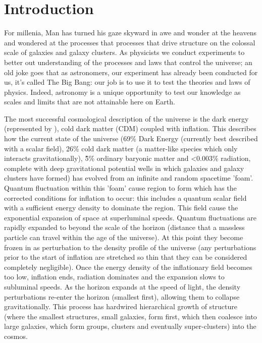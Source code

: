 \chapter{Introduction}
For millenia, Man has turned his gaze skyward in awe and wonder at the heavens and wondered at the processes that processes that drive structure on the colossal scale of galaxies and galaxy clusters. As physicists we conduct experiments to better out understanding of the processes and laws that control the universe; an old joke goes that as astronomers, our experiment has already been conducted for us, it's called The Big Bang: our job is to use it to test the theories and laws of physics. Indeed, astronomy is a unique opportunity to test our knowledge as scales and limits that are not attainable here on Earth.


The most successful cosmological description of the universe is the dark energy (represented by \textLambda), cold dark matter ({\textLambda}CDM) coupled with inflation. This describes how the current state of the universe (69\% Dark Energy (currently best described with a scalar field), 26\% cold dark matter (a matter-like species which only interacts gravitationally), \~5\% ordinary baryonic matter and <0.003\% radiation, complete with deep gravitational potential wells in which galaxies and galaxy clusters have formed) has evolved from an infinite and random spacetime 'foam'. Quantum fluctuation within this 'foam' cause region to form which has the corrected conditions for inflation to occur: this includes a quantum scalar field with a sufficient energy density to dominate the region. This field cause the exponential expansion of space at superluminal speeds. Quantum fluctuations are rapidly expanded to beyond the scale of the horizon (distance that a massless particle can travel within the age of the universe). At this point they become frozen in as perturbation to the density profile of the universe (any perturbations prior to the start of inflation are stretched so thin that they can be considered completely negligible). Once the energy density of the inflationary field becomes too low, inflation ends, radiation dominates and the expansion slows to subluminal speeds. As the horizon expands at the speed of light, the density perturbations re-enter the horizon (smallest first), allowing them to collapse gravitationally. This process has hardwired hierarchical growth of structure (where the smallest structures, small galaxies, form first, which then coalesce into large galaxies, which form groups, clusters and eventually super-clusters) into the cosmos. 


